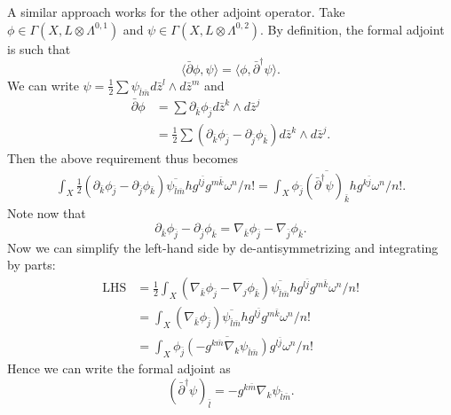 \documentclass{../mathnotes}
\begin{document}
\begin{enumerate}[(a)]
        A similar approach works for the other adjoint operator. Take $\phi\in\Gamma(X,L\otimes \Lambda^{0,1})$ and $\psi\in\Gamma(X,L\otimes\Lambda^{0,2})$. By definition,
        the formal adjoint is such that
        \[\langle \bar\partial \phi,\psi\rangle=\langle\phi,\bar\partial^\dagger\psi\rangle.\]
        We can write $\psi=\frac{1}{2}\sum\psi_{\bar l\bar m}d\bar z^l\wedge d\bar z^m$ and
        \begin{align*}
            \bar\partial\phi&=\sum\partial_{\bar k}\phi_{\bar j}d\bar z^k\wedge d\bar z^j\\
            &=\frac{1}{2}\sum\left( \partial_{\bar k}\phi_{\bar j}-\partial_{\bar j}\phi_{\bar k}\right)d\bar z^k\wedge d\bar z^j.
        \end{align*}
        Then the above requirement thus becomes
        \begin{align*}
            \int_X \frac{1}{2}\left( \partial_{\bar k}\phi_{\bar j}-\partial_{\bar j}\phi_{\bar k}  \right)\overline{\psi_{\bar l\bar m}}hg^{l\bar j}g^{m\bar k}\omega^n/n!=\int_X \phi_{\bar j}\overline{(\bar\partial^\dagger\psi)_{\bar k}}hg^{k\bar j}\omega^n/n!.
        \end{align*}
        Note now that
        \[\partial_{\bar k}\phi_{\bar j}-\partial_{\bar j}\phi_{\bar k}=\nabla_{\bar k}\phi_{\bar j}-\nabla_{\bar j}\phi_{\bar k}.\]
        Now we can simplify the left-hand side by de-antisymmetrizing and integrating by parts:
        \begin{align*}
            \text{LHS}&=\frac{1}{2}\int_X(\nabla_{\bar k}\phi_{\bar j}-\nabla_j\phi_{\bar k})\overline{\psi_{\bar l\bar m}}hg^{l\bar j}g^{m\bar k}\omega^n/n!\\
            &=\int_X(\nabla_{\bar k}\phi_{\bar j}) \overline{\psi_{\bar l\bar m}}hg^{l\bar j}g^{m\bar k}\omega^n/n!\\
            &=\int_X \phi_{\bar j}\overline{(-g^{k\bar m}\nabla_k\psi_{\bar l\bar m})}g^{l\bar j}\omega^n/n!
        \end{align*}
        Hence we can write the formal adjoint as
        \[\boxed{(\bar\partial^\dagger\psi)_{\bar l}=-g^{k\bar m}\nabla_k\psi_{\bar l\bar m}.}\]


\end{enumerate}
\end{document}
